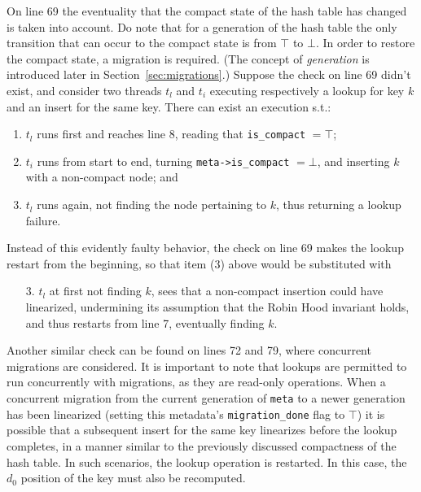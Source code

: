 On line 69 the eventuality that the compact state of the hash table has changed is taken into account.
Do note that for a generation of the hash table the only transition that can occur to the compact state is from $\top$ to $\bot$.
In order to restore the compact state, a migration is required.
(The concept of \emph{generation} is introduced later in Section~\ref{sec:migrations}.)
Suppose the check on line 69 didn't exist, and consider two threads $t_l$ and $t_i$ executing respectively a lookup for key $k$ and an insert for the same key.
There can exist an execution s.t.:
\begin{enumerate}
    \item $t_l$ runs first and reaches line 8, reading that \texttt{is\_compact} $= \top$;
    \item $t_i$ runs from start to end, turning \texttt{{meta->is\_compact}} $= \bot$, and inserting $k$ with a non-compact node; and
    \item $t_l$ runs again, not finding the node pertaining to $k$, thus returning a lookup failure.
\end{enumerate}
Instead of this evidently faulty behavior, the check on line 69 makes the lookup restart from the beginning, so that item (3) above would be substituted with
\begin{enumerate}
    \item[3.] $t_l$ at first not finding $k$, sees that a non-compact insertion could have linearized, undermining its assumption that the Robin Hood invariant holds, and thus restarts from line 7, eventually finding $k$.
\end{enumerate}

Another similar check can be found on lines 72 and 79, where concurrent migrations are considered.
It is important to note that lookups are permitted to run concurrently with migrations, as they are read-only operations.
When a concurrent migration from the current generation of \texttt{meta} to a newer generation has been linearized (setting this metadata's \texttt{{migration\_done}} flag to $\top$) it is possible that a subsequent insert for the same key linearizes before the lookup completes, in a manner similar to the previously discussed compactness of the hash table.
In such scenarios, the lookup operation is restarted.
In this case, the $d_0$ position of the key must also be recomputed.

